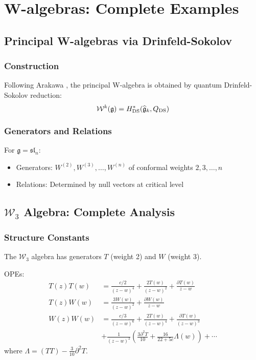 \chapter{W-algebras: Complete Examples}

\section{Principal W-algebras via Drinfeld-Sokolov}

\subsection{Construction}

Following Arakawa \cite{Ara07}, the principal W-algebra is obtained by quantum Drinfeld-Sokolov reduction:
$$\mathcal{W}^k(\mathfrak{g}) = H^*_{\text{DS}}(\widehat{\mathfrak{g}}_k, Q_{\text{DS}})$$

\subsection{Generators and Relations}

For $\mathfrak{g} = \mathfrak{sl}_n$:
\begin{itemize}
\item Generators: $W^{(2)}, W^{(3)}, \ldots, W^{(n)}$ of conformal weights $2, 3, \ldots, n$
\item Relations: Determined by null vectors at critical level
\end{itemize}

\section{$\mathcal{W}_3$ Algebra: Complete Analysis}

\subsection{Structure Constants}

The $\mathcal{W}_3$ algebra has generators $T$ (weight 2) and $W$ (weight 3).

OPEs:
\begin{align}
T(z)T(w) &= \frac{c/2}{(z-w)^4} + \frac{2T(w)}{(z-w)^2} + \frac{\partial T(w)}{z-w} \\
T(z)W(w) &= \frac{3W(w)}{(z-w)^2} + \frac{\partial W(w)}{z-w} \\
W(z)W(w) &= \frac{c/3}{(z-w)^6} + \frac{2T(w)}{(z-w)^4} + \frac{\partial T(w)}{(z-w)^3} \\
&+ \frac{1}{(z-w)^2}\left(\frac{3\partial^2 T}{10} + \frac{16}{22+5c}\Lambda(w)\right) + \cdots
\end{align}
where $\Lambda = (TT) - \frac{3}{10}\partial^2 T$.

